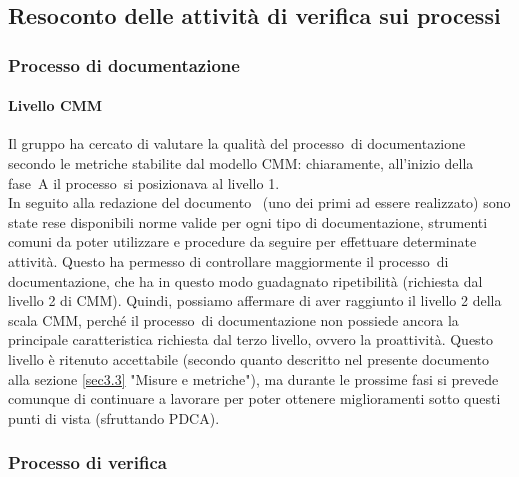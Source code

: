 \documentclass[../PianoDiQualifica.tex]{subfiles}
\begin{document}
\begin{appendices}
	\subsection{Resoconto delle attività di verifica sui processi}
		\subsubsection{Processo di documentazione}
			\paragraph{Livello CMM}
			Il gruppo ha cercato di valutare la qualità del processo\g\ di documentazione secondo le metriche stabilite dal modello CMM\g: chiaramente, all'inizio della fase\g\ A il processo\g\ si posizionava al livello 1.\\
			In seguito alla redazione del documento \normediprogetto\ (uno dei primi ad essere realizzato) sono state rese disponibili norme valide per ogni tipo di documentazione, strumenti comuni da poter utilizzare e procedure da seguire per effettuare determinate attività. Questo ha permesso di controllare maggiormente il processo\g\ di documentazione, che ha in questo modo guadagnato ripetibilità (richiesta dal livello 2 di CMM\g).
			Quindi, possiamo affermare di aver raggiunto il livello 2 della scala CMM\g, perché il processo\g\ di documentazione non possiede ancora la principale caratteristica richiesta dal terzo livello, ovvero la proattività.
			Questo livello è ritenuto accettabile (secondo quanto descritto nel presente documento alla sezione \ref{sec3.3} "Misure e metriche"), ma durante le prossime fasi si prevede comunque di continuare a lavorare per poter ottenere miglioramenti sotto questi punti di vista (sfruttando PDCA\g).
		\subsubsection{Processo di verifica}

\end{appendices}
\end{document}
